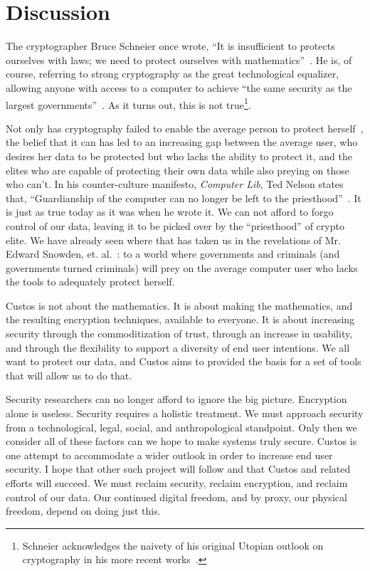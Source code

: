 \section{Discussion}

The cryptographer Bruce Schneier once wrote, ``It is insufficient to
protects ourselves with laws; we need to protect ourselves with
mathematics''~\cite{schneier1996applied}. He is, of course, referring
to strong cryptography as the great technological equalizer, allowing
anyone with access to a computer to achieve ``the same security as the
largest governments''~\cite{schneier2000secrets}. As it turns out,
this is not true\footnote{Schneier acknowledges the naivety of his
  original Utopian outlook on cryptography in his more recent
  works~\cite{schneier2000secrets}.}.

Not only has cryptography failed to enable the average person to
protect herself~\cite{green-challenge}, the belief that it can has led
to an increasing gap between the average user, who desires her data to
be protected but who lacks the ability to protect it, and the elites
who are capable of protecting their own data while also preying on
those who can't. In his counter-culture manifesto, \textit{Computer
  Lib}, Ted Nelson states that, ``Guardianship of the computer can no
longer be left to the priesthood''~\cite{nelson1972computer}. It is
just as true today as it was when he wrote it. We can not afford to
forgo control of our data, leaving it to be picked over by the
``priesthood'' of crypto elite. We have already seen where that has
taken us in the revelations of Mr. Edward Snowden,
et. al.~\cite{GreenwaldPrism}: to a world where governments and
criminals (and governments turned criminals) will prey on the average
computer user who lacks the tools to adequately protect herself.

Custos is not about the mathematics. It is about making the
mathematics, and the resulting encryption techniques, available to
everyone. It is about increasing security through the commoditization
of trust, through an increase in usability, and through the
flexibility to support a diversity of end user intentions. We all want
to protect our data, and Custos aims to provided the basis for a set
of tools that will allow us to do that.

Security researchers can no longer afford to ignore the big
picture. Encryption alone is useless. Security requires a holistic
treatment. We must approach security from a technological, legal,
social, and anthropological standpoint. Only then we consider all of
these factors can we hope to make systems truly secure. Custos is one
attempt to accommodate a wider outlook in order to increase end user
security. I hope that other such project will follow and that Custos
and related efforts will succeed. We must reclaim security, reclaim
encryption, and reclaim control of our data. Our continued digital
freedom, and by proxy, our physical freedom, depend on doing just
this.


